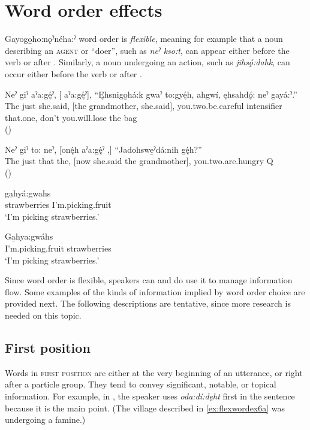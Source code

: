 \chapter{Word order effects} \label{ch:Word order effects}
Gayogo̱ho:nǫˀnéha:ˀ word order is \emph{flexible}, meaning for example that a noun describing an \textsc{agent} or “doer”, such as \textit{neˀ kso:t}, can appear either before the verb  or after . Similarly, a noun undergoing an action, such as \textit{jihsǫ́:dahk}, can occur either before the verb  or after . 

\ea\label{ex:flexwordex}
\gll Neˀ giˀ aˀa:gę́ˀ, [  aˀa:gę́ˀ], “Ęhsnigǫ̱há:k gwaˀ to:gyę́h, ahgwí, ęhsahdǫ́: neˀ gayá:ˀ.”\\
The just she.said, [the grandmother, she.said], you.two.be.careful intensifier that.one, don’t you.will.lose the bag\\
\glt {}(\cite{henry_de_2005})
\z

\ea\label{ex:flexwordex2} 
\gll Neˀ giˀ to: neˀ, [onę́h aˀa:gę́ˀ  ,] “Jadohswe̱ˀdá:nih gę́h?” \\
The just that the, [now she.said the grandmother], you.two.are.hungry Q \\
\glt {} (\cite{henry_de_2005})
\z

\ea\label{ex:flexwordex3}
\gll {} ga̱hyá:gwahs \\
strawberries I’m.picking.fruit\\
\glt ‘I’m picking strawberries.’
\z

\ea\label{ex:flexwordex4} 
\gll Ga̱hya:gwáhs  \\
I’m.picking.fruit strawberries\\
\glt ‘I’m picking strawberries.’
\z

Since word order is flexible, speakers can and do use it to manage information flow. Some examples of the kinds of information implied by word order choice are provided next. The following descriptions are tentative, since more research is needed on this topic.

\section{First position} \label{ch:First position}
Words in \textsc{first position} are either at the very beginning of an utterance, or right after a particle group. They tend to convey significant, notable, or topical information. For example, in , the speaker uses \textit{oda:dí:dęht} first in the sentence because it is the main point. (The village described in \ref{ex:flexwordex6a} was undergoing a famine.)

